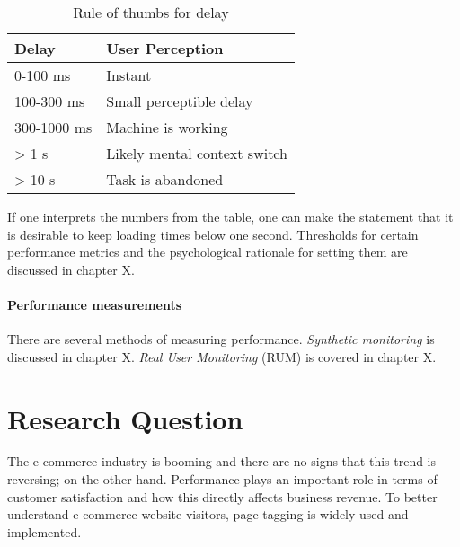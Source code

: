 \begin{table}[h]
	\centering
	\begin{tabular}{| l | l | }
	\hline
	Delay & User Perception \\
	\hline
	0-100 ms & Instant \\
	100-300 ms & Small perceptible delay \\
	300-1000 ms & Machine is working \\
	> 1 s & Likely mental context switch \\
	> 10 s & Task is abandoned \\
	\hline
	\end{tabular}
	\label{table:perception}
	\caption{Rule of thumbs for delay}
\end{table}

If one interprets the numbers from the table, one can make the statement that it is desirable to keep loading times below one second.
Thresholds for certain performance metrics and the psychological rationale for setting them are discussed in chapter X. %





\paragraph{Performance measurements}

There are several methods of measuring performance.
\textit{Synthetic monitoring }is discussed in chapter X.
\textit{Real User Monitoring} (RUM) is covered in chapter X.







\section{Research Question}
\label{chapter:research_question}

The e-commerce industry is booming and there are no signs that this trend is reversing; on the other hand.
Performance plays an important role in terms of customer satisfaction and how this directly affects business revenue.
To better understand e-commerce website visitors, page tagging is widely used and implemented.

